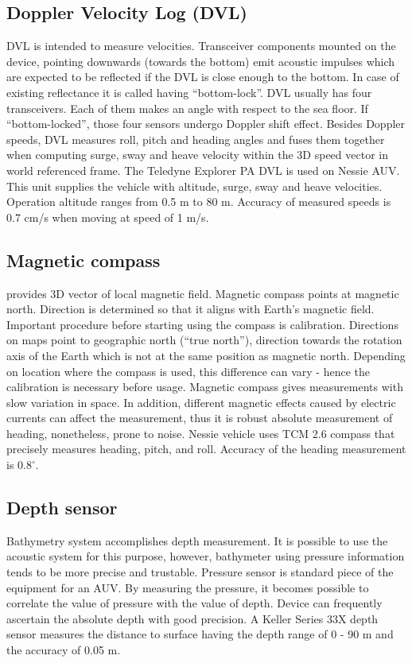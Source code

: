 \subsection{Doppler Velocity Log (DVL)}
DVL is intended to measure  velocities. Transceiver components mounted on the device, pointing downwards (towards the bottom) emit acoustic impulses which are expected to be reflected if the DVL is close enough to the bottom. In case of existing reflectance it is called having ``bottom-lock''. DVL usually has four transceivers. Each of them makes an angle with respect to the sea floor. If ``bottom-locked'', those four sensors undergo Doppler shift effect. Besides Doppler speeds, DVL measures roll, pitch and heading angles and fuses them together when computing surge, sway and heave velocity within the 3D speed vector in world referenced frame. The Teledyne Explorer PA DVL is used on Nessie AUV. This unit supplies the vehicle with altitude, surge, sway and heave velocities. Operation altitude ranges from 0.5 m to 80 m. Accuracy of measured speeds is 0.7 cm/s when moving at speed of 1 m/s.

\subsection{Magnetic compass} 
provides 3D vector of local magnetic field. Magnetic compass points at magnetic north. Direction is determined so that it aligns with Earth's magnetic field. Important procedure before starting using the compass is calibration. Directions on maps point to geographic north (``true north''), direction towards the rotation axis of the Earth which is not at the same position as magnetic north. Depending on location where the compass is used, this difference can vary - hence the calibration is necessary before usage. Magnetic compass gives measurements with slow variation in space. In addition, different magnetic effects caused by electric currents can affect the measurement, thus it is robust absolute measurement of heading, nonetheless, prone to noise. Nessie vehicle uses TCM 2.6 compass that precisely measures heading, pitch, and roll. Accuracy of the heading measurement is $0.8^{\circ}$.
\subsection{Depth sensor} 
Bathymetry system accomplishes depth measurement. It is possible to use the acoustic system for this purpose, however, bathymeter using pressure information tends to be more precise and trustable. Pressure sensor is standard piece of the equipment for an AUV. By measuring the pressure, it becomes possible to correlate the value of pressure with the value of depth. Device can frequently ascertain the absolute depth with good precision. A Keller Series 33X depth sensor measures the distance to surface having the depth range of 0 - 90 m and the accuracy of 0.05 m. 
